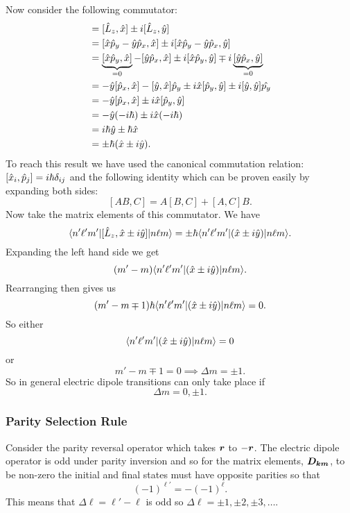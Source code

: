 \documentclass[a4paper]{article}
\renewcommand{\ket}[1]{\vert {#1} \rangle}
\renewcommand{\bra}[1]{\langle {#1} \vert}
\begin{document}
    Now consider the following commutator:
    \begin{align*}
        [\operator{L}_z, \operator{x} \pm i\operator{y}] &= [\operator{L}_z, \operator{x}] \pm i[\operator{L}_z, \operator{y}]\\
        &= [\operator{x}\operator{p}_y - \operator{y}\operator{p}_x, \operator{x}] \pm i[\operator{x}\operator{p}_y - \operator{y}\operator{p}_x, \operator{y}]\\
        &= \underbrace{[\operator{x}\operator{p}_y, \operator{x}]}_{=0} - [\operator{y}\operator{p}_x, \operator{x}] \pm i[\operator{x}\operator{p}_y, \operator{y}] \mp i\underbrace{[\operator{y}\operator{p}_x, \operator{y}]}_{=0}\\
        &= -\operator{y}[\operator{p}_x, \operator{x}] - [\operator{y}, \operator{x}]\operator{p}_y \pm i\operator{x}[\operator{p}_y,\operator{y}] \pm i[\operator{y}, \operator{y}]\operator{p_y}\\
        &= -\operator{y}[\operator{p}_x, \operator{x}] \pm i\operator{x}[\operator{p}_y, \operator{y}]\\
        &= -\operator{y}(-i\hbar) \pm i\operator{x}(-i\hbar)\\
        &= i\hbar\operator{y} \pm \hbar\operator{x}\\
        &= \pm\hbar(\operator{x}\pm i\operator{y}).
    \end{align*}
    To reach this result we have used the canonical commutation relation: \([\hat{x}_i, \hat{p}_j] = i\hbar\delta_{ij}\) and the following identity which can be proven easily by expanding both sides:
    \[[AB, C] = A[B, C] + [A, C]B.\]
    Now take the matrix elements of this commutator.
    We have
    \[\bra{n'\ell'm'}[\operator{L}_z, \operator{x} \pm i\operator{y}]\ket{n\ell m} = \pm\hbar\bra{n'\ell'm'}(\operator{x} \pm i\operator{y})\ket{n\ell m}.\]
    Expanding the left hand side we get
    \[(m' - m)\bra{n'\ell'm'}(\operator{x} \pm i\operator{y})\ket{n\ell m}.\]
    Rearranging then gives us
    \[(m' - m \mp 1)\hbar\bra{n'\ell'm'}(\operator{x} \pm i\operator{y})\ket{n\ell m} = 0.\]
    So either
    \[\bra{n'\ell'm'}(\operator{x} \pm i\operator{y})\ket{n\ell m} = 0\]
    or
    \[m' - m \mp 1 = 0 \implies \Delta m = \pm 1.\]
    So in general electric dipole transitions can only take place if
    \[\Delta m = 0, \pm 1.\]
    
    \subsubsection{Parity Selection Rule}
    Consider the parity reversal operator which takes \(\bm{r}\) to \(-\bm{r}\).
    The electric dipole operator is odd under parity inversion and so for the matrix elements, \(\bm{D_{km}}\), to be non-zero the initial and final states must have opposite parities so that
    \[(-1)^{\ell'} = -(-1)^{\ell}.\]
    This means that \(\Delta \ell = \ell' - \ell\) is odd so \(\Delta \ell = \pm 1, \pm 2, \pm 3, \dotsc\).
    
\end{document}
